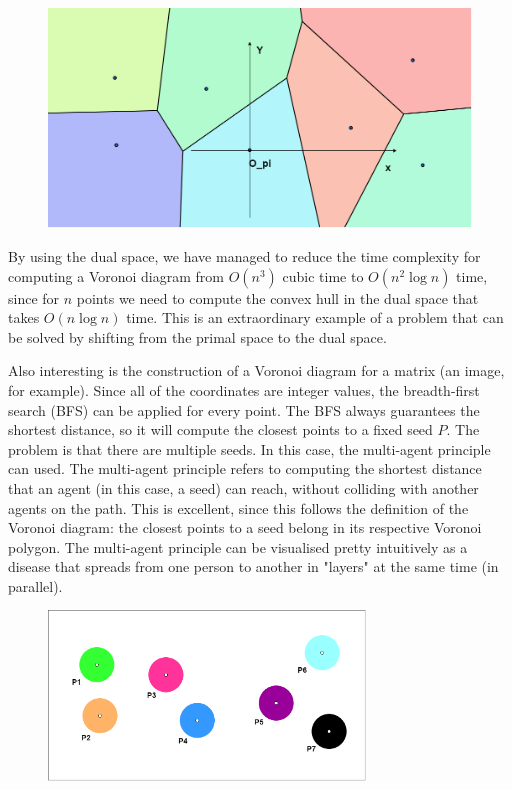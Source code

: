 \documentclass[letterpaper]{article}
\begin{document}
\newpage

\begin{figure} [h!]
\centering
\includegraphics[width=1\textwidth]{pngOfDiagrams/voronoixoy.png}
\end{figure}

By using the dual space, we have managed to reduce the time complexity for computing a Voronoi diagram from $O(n^3)$ cubic time to $O(n^2 \log n)$ time, since for $n$ points we need to compute the convex hull in the dual space that takes $O(n \log n)$ time. This is an extraordinary example of a problem that can be solved by shifting from the primal space to the dual space.

Also interesting is the construction of a Voronoi diagram for a matrix (an image, for example). Since all of the coordinates are integer values, the breadth-first search (BFS) can be applied for every point. The BFS always guarantees the shortest distance, so it will compute the closest points to a fixed seed $P$. The problem is that there are multiple seeds. In this case, the multi-agent principle can used. The multi-agent principle refers to computing the shortest distance that an agent (in this case, a seed) can reach, without colliding with another agents on the path. This is excellent, since this follows the definition of the Voronoi diagram: the closest points to a seed belong in its respective Voronoi polygon. The multi-agent principle can be visualised pretty intuitively as a disease that spreads from one person to another in "layers" at the same time (in parallel).

\begin{figure} [h!]
\centering
\includegraphics[width=0.75\textwidth]{pngOfDiagrams/voronoimulti.png}
\end{figure}
\end{document}
